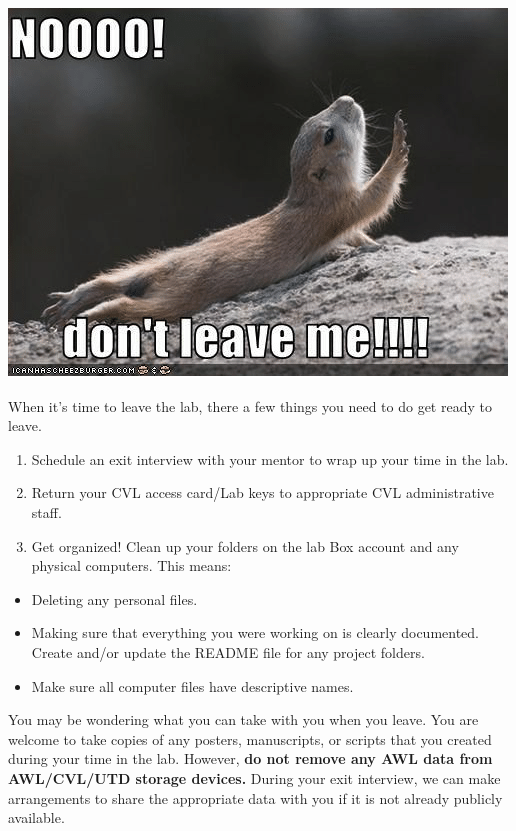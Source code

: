 \documentclass[
]{book}
\providecommand{\tightlist}{%
  \setlength{\itemsep}{0pt}\setlength{\parskip}{0pt}}
\begin{document}
\includegraphics{images/leave.png}

When it's time to leave the lab, there a few things you need to do get ready to leave.

\begin{enumerate}
\def\labelenumi{(\arabic{enumi})}
\tightlist
\item
  Schedule an exit interview with your mentor to wrap up your time in the lab.
\item
  Return your CVL access card/Lab keys to appropriate CVL administrative staff.
\item
  Get organized! Clean up your folders on the lab Box account and any physical computers. This means:
\end{enumerate}

\begin{itemize}
\tightlist
\item
  Deleting any personal files.
\item
  Making sure that everything you were working on is clearly documented. Create and/or update the README file for any project folders.
\item
  Make sure all computer files have descriptive names.
\end{itemize}

You may be wondering what you can take with you when you leave. You are welcome to take copies of any posters, manuscripts, or scripts that you created during your time in the lab. However, \textbf{do not remove any AWL data from AWL/CVL/UTD storage devices.} During your exit interview, we can make arrangements to share the appropriate data with you if it is not already publicly available.
\end{document}
